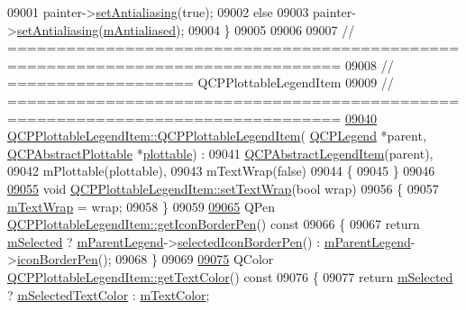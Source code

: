 \begin{DoxyCode}
09001     painter->\hyperlink{a00047_aaba1deb9188244d9ea65b035112b4d05}{setAntialiasing}(\textcolor{keyword}{true});
09002   \textcolor{keywordflow}{else}
09003     painter->\hyperlink{a00047_aaba1deb9188244d9ea65b035112b4d05}{setAntialiasing}(\hyperlink{a00023_a796a604ca3309960968aec8067bfc327}{mAntialiased});
09004 \}
09005 
09006 
09007 \textcolor{comment}{// ================================================================================}
09008 \textcolor{comment}{// =================== QCPPlottableLegendItem}
09009 \textcolor{comment}{// ================================================================================}
\hypertarget{a00115_source_l09040}{}\hyperlink{a00048_ac1072591fe409d3dabad51b23ee4d6c5}{09040} \textcolor{comment}{}\hyperlink{a00048_ac1072591fe409d3dabad51b23ee4d6c5}{QCPPlottableLegendItem::QCPPlottableLegendItem}(
      \hyperlink{a00045}{QCPLegend} *parent, \hyperlink{a00024}{QCPAbstractPlottable} *\hyperlink{a00116_a5c198d46ea2a2255a1b73e2c590f0364}{plottable}) :
09041   \hyperlink{a00023}{QCPAbstractLegendItem}(parent),
09042   mPlottable(plottable),
09043   mTextWrap(false)
09044 \{
09045 \}
09046 
\hypertarget{a00115_source_l09055}{}\hyperlink{a00048_ad5155ff022427947dc5c015cbf8e28b7}{09055} \textcolor{keywordtype}{void} \hyperlink{a00048_ad5155ff022427947dc5c015cbf8e28b7}{QCPPlottableLegendItem::setTextWrap}(\textcolor{keywordtype}{bool} wrap)
09056 \{
09057   \hyperlink{a00048_a074d2372cb8954d30ff8ad533462ce96}{mTextWrap} = wrap;
09058 \}
09059 
\hypertarget{a00115_source_l09065}{}\hyperlink{a00048_ab36270e6b022a6961fa44136f35c0e4b}{09065} QPen \hyperlink{a00048_ab36270e6b022a6961fa44136f35c0e4b}{QCPPlottableLegendItem::getIconBorderPen}()\textcolor{keyword}{ const}
09066 \textcolor{keyword}{}\{
09067   \textcolor{keywordflow}{return} \hyperlink{a00023_ae58ebebbd0c36cc6fe897483369984d2}{mSelected} ? \hyperlink{a00023_aafcd9fc6fcb10f4a8d46037011afafe8}{mParentLegend}->\hyperlink{a00045_a165630cad7e41f89b54f65cdef3310e8}{selectedIconBorderPen}() : 
      \hyperlink{a00023_aafcd9fc6fcb10f4a8d46037011afafe8}{mParentLegend}->\hyperlink{a00045_a2c4719d79630b0d0c75ef2333c59a912}{iconBorderPen}();
09068 \}
09069 
\hypertarget{a00115_source_l09075}{}\hyperlink{a00048_ad762b07439c738660ba93e78c1d03667}{09075} QColor \hyperlink{a00048_ad762b07439c738660ba93e78c1d03667}{QCPPlottableLegendItem::getTextColor}()\textcolor{keyword}{ const}
09076 \textcolor{keyword}{}\{
09077   \textcolor{keywordflow}{return} \hyperlink{a00023_ae58ebebbd0c36cc6fe897483369984d2}{mSelected} ? \hyperlink{a00023_a4965c13854d970b24c284f0a4f005fbd}{mSelectedTextColor} : \hyperlink{a00023_a974b21e9930227d281344bd2242d289d}{mTextColor};

\end{DoxyCode}
